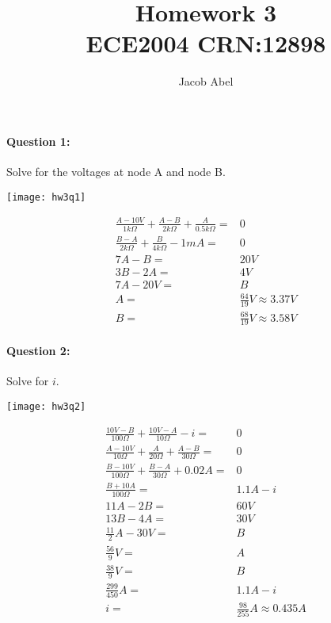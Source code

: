 \documentclass[12pt,letterpaper,titlepage]{article}
\author{Jacob Abel}
\title{	Homework 3
	\\\large ECE2004 CRN:12898
}
\begin{document}
\maketitle
\begin{raggedright}

\paragraph{Question 1: }

Solve for the voltages at node A and node B.

\begin{center}
\texttt{[image: hw3q1]}
\end{center}

\begin{align*}
    \frac{A-10V}{1k\Omega} + \frac{A-B}{2k\Omega} + \frac{A}{0.5k\Omega} =& 0
\\  \frac{B-A}{2k\Omega} + \frac{B}{4k\Omega} - 1mA =& 0
\\  7A - B =& 20V
\\  3B - 2A =& 4V
\\  7A - 20V =& B
\\  A =& \frac{64}{19}V\approx 3.37V
\\  B =& \frac{68}{19}V\approx 3.58V
\end{align*}

\clearpage

\paragraph{Question 2: }

Solve for $i$.

\begin{center}
\texttt{[image: hw3q2]}
\end{center}

\begin{align*}
    \frac{10V-B}{100\Omega} + \frac{10V-A}{10\Omega} - i =& 0
\\  \frac{A-10V}{10\Omega} + \frac{A}{20\Omega} + \frac{A-B}{30\Omega}=& 0
\\  \frac{B-10V}{100\Omega} + \frac{B-A}{30\Omega} + 0.02A =& 0
\\  \frac{B + 10A}{100\Omega} =& 1.1A - i
\\  11A - 2B =& 60V
\\  13B - 4A =& 30V
\\  \frac{11}{2}A - 30V =& B
\\  \frac{56}{9}V =& A
\\  \frac{38}{9}V =& B
\\  \frac{299}{450}A =& 1.1A - i
\\  i =& \frac{98}{255}A \approx 0.435A 
\end{align*}


\end{raggedright}
\end{document}
